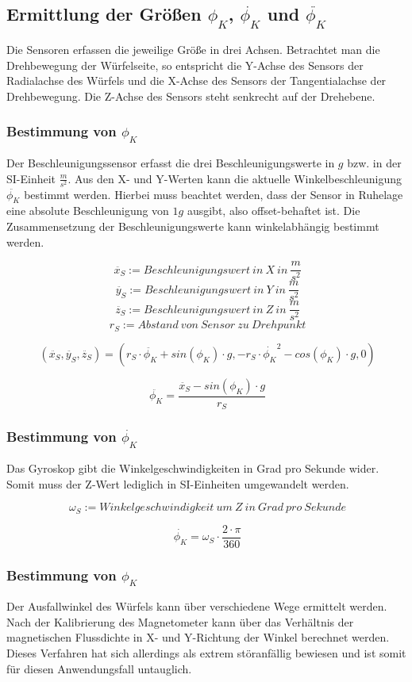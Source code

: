 \documentclass{article}
\begin{document}
\subsection{Ermittlung der Größen $\phi_K$, $\dot{\phi_K}$ und $\ddot{\phi_K}$}
Die Sensoren erfassen die jeweilige Größe in drei Achsen. Betrachtet man die Drehbewegung der Würfelseite, so entspricht die Y-Achse des Sensors der Radialachse des Würfels und die X-Achse des Sensors der Tangentialachse der Drehbewegung. Die Z-Achse des Sensors steht senkrecht auf der Drehebene.

\subsubsection{Bestimmung von $\phi_K$}
Der Beschleunigungssensor erfasst die drei Beschleunigungswerte in $g$ bzw. in der SI-Einheit $\frac{m}{s^2}$. Aus den X- und Y-Werten kann die aktuelle Winkelbeschleunigung $\ddot{\phi_K}$ bestimmt werden. Hierbei muss beachtet werden, dass der Sensor in Ruhelage eine absolute Beschleunigung von $1g$ ausgibt, also offset-behaftet ist. Die Zusammensetzung der Beschleunigungswerte kann winkelabhängig bestimmt werden.

\[\ \ddot{x_S} := Beschleunigungswert \ in \ X \ in \ \frac{m}{s^2} \]
\[\ \ddot{y_S} := Beschleunigungswert \ in \ Y \ in \ \frac{m}{s^2} \]
\[\ \ddot{z_S} := Beschleunigungswert \ in \ Z \ in \ \frac{m}{s^2} \]
\[\ r_S := Abstand \ von  \ Sensor \ zu \ Drehpunkt \]

\[\ (\ddot{x_S}, \ddot{y_S}, \ddot{z_S}) = (r_S \cdot \ddot{\phi_K} + sin(\phi_K) \cdot g , -r_S \cdot {\dot{\phi_K}}^2 - cos(\phi_K) \cdot g , 0) \]

\[\ \ddot{\phi_K} = \frac{\ddot{x_S} - sin(\phi_K) \cdot g }{r_S} \]

\subsubsection{Bestimmung von $\dot{\phi_K}$}
Das Gyroskop gibt die Winkelgeschwindigkeiten in Grad pro Sekunde wider. Somit muss der Z-Wert lediglich in SI-Einheiten umgewandelt werden.

\[\ {\omega_S} := Winkelgeschwindigkeit \ um \ Z \ in \ Grad \ pro \ Sekunde \]

\[\ \dot{\phi_K} = {\omega_S} \cdot \frac{2 \cdot \pi}{360} \]

\subsubsection{Bestimmung von $\phi_K$}
Der Ausfallwinkel des Würfels kann über verschiedene Wege ermittelt werden. Nach der Kalibrierung des Magnetometer kann über das Verhältnis der magnetischen Flussdichte in X- und Y-Richtung der Winkel berechnet werden. Dieses Verfahren hat sich allerdings als extrem störanfällig bewiesen und ist somit für diesen Anwendungsfall untauglich.
\end{document}
